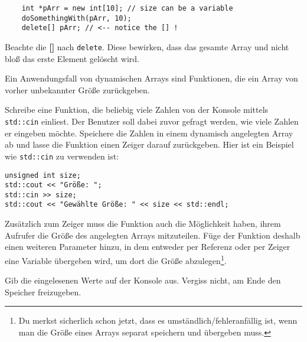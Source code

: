 \begin{lstlisting}
	int *pArr = new int[10]; // size can be a variable
	doSomethingWith(pArr, 10);
	delete[] pArr; // <-- notice the [] !
\end{lstlisting}

Beachte die \textbf{[]} nach \lstinline{delete}.
Diese bewirken, dass das gesamte Array und nicht bloß das erste Element gelöscht wird.

Ein Anwendungsfall von dynamischen Arrays sind Funktionen, die ein Array von vorher unbekannter Größe zurückgeben.

Schreibe eine Funktion, die beliebig viele Zahlen von der Konsole mittels \lstinline{std::cin} einliest.
Der Benutzer soll dabei zuvor gefragt werden, wie viele Zahlen er eingeben möchte.
Speichere die Zahlen in einem dynamisch angelegten Array ab und lasse die Funktion einen Zeiger darauf zurückgeben.
Hier ist ein Beispiel wie \lstinline{std::cin} zu verwenden ist:

\begin{lstlisting}
unsigned int size;
std::cout << "Größe: ";
std::cin >> size;
std::cout << "Gewählte Größe: " << size << std::endl;
\end{lstlisting}

Zusätzlich zum Zeiger muss die Funktion auch die Möglichkeit haben, ihrem Aufrufer die Größe des angelegten Arrays mitzuteilen.
Füge der Funktion deshalb einen weiteren Parameter hinzu, in dem entweder per Referenz oder per Zeiger eine Variable übergeben wird, um dort die Größe abzulegen\footnote{Du merkst sicherlich schon jetzt, dass es umständlich/fehleranfällig ist, wenn man die Größe eines Arrays separat speichern und übergeben muss.}.

Gib die eingelesenen Werte auf der Konsole aus.
Vergiss nicht, am Ende den Speicher freizugeben.
